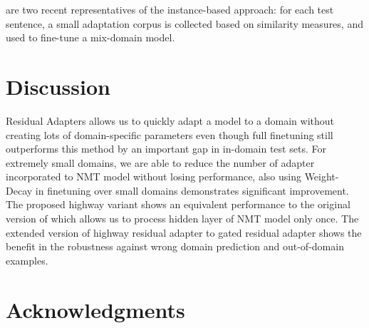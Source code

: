 \documentclass[11pt,a4paper]{article}
\newcommand{\mpTodo}[1]{\Todo[MP:]{\textcolor{green}{#1}}}
\begin{document}
\citet{Farajian17multidomain,li-etal-2018-one} are two recent representatives of the instance-based approach: for each test sentence, a small adaptation corpus is collected based on similarity measures, and used to fine-tune a mix-domain model.

\section{Discussion \label{sec:discussion}}
\mpTodo{discussion}
Residual Adapters allows us to quickly adapt a model to a domain without creating lots of domain-specific parameters even though full finetuning still outperforms this method by an important gap in in-domain test sets. For extremely small domains, we are able to reduce the number of adapter incorporated to NMT model without losing performance, also using Weight-Decay in finetuning over small domains demonstrates significant improvement. The proposed highway variant shows an equivalent performance to the original version of \cite{Bapna19simple} which allows us to process hidden layer of NMT model only once. The extended version of highway residual adapter to gated residual adapter shows the benefit in the robustness against wrong domain prediction and out-of-domain examples. 

\section*{Acknowledgments}



\end{document}
